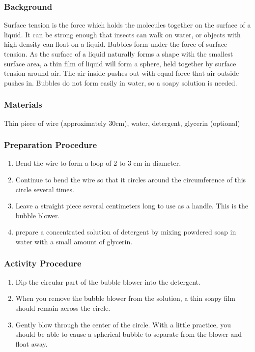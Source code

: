 \subsubsection*{Background}
Surface tension is the force which holds the molecules together on the surface of a liquid. It can be strong enough that insects can walk on water, or objects with high density can float on a liquid. Bubbles form under the force of surface tension. As the surface of a liquid naturally forms a shape with the smallest surface area, a thin film of liquid will form a sphere, held together by surface tension around air. The air inside pushes out with equal force that air outside pushes in. Bubbles do not form easily in water, so a soapy solution is needed.

\subsubsection*{Materials}
Thin piece of wire (approximately 30cm), water, detergent, glycerin (optional)

\subsubsection*{Preparation Procedure}
\begin{enumerate}
\item{Bend the wire to form a loop of 2 to 3 cm in diameter.}
\item{Continue to bend the wire so that it circles around the circumference of this circle several times.}
\item{Leave a straight piece several centimeters long to use as a handle. This is the bubble blower.}
\item{prepare a concentrated solution of detergent by mixing powdered soap in water with a small amount of glycerin.}
\end{enumerate}

\subsubsection*{Activity Procedure}
\begin{enumerate}
\item{Dip the circular part of the bubble blower into the detergent.}
\item{When you remove the bubble blower from the solution, a thin soapy film should remain across the circle.}
\item{Gently blow through the center of the circle. With a little practice, you should be able to cause a spherical bubble to separate from the blower and float away.}
\end{enumerate}

